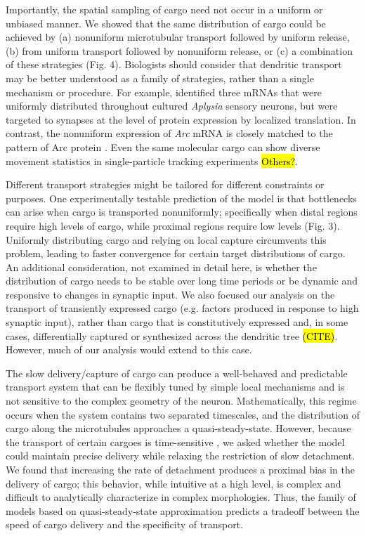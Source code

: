\documentclass[11pt]{wlpeerj}
\begin{document}
Importantly, the spatial sampling of cargo need not occur in a uniform or unbiased manner. We showed that the same distribution of cargo could be achieved by (a) nonuniform microtubular transport followed by uniform release, (b) from uniform transport followed by nonuniform release, or (c) a combination of these strategies (Fig. 4).
Biologists should consider that dendritic transport may be better understood as a family of strategies, rather than a single mechanism or procedure.
For example, \cite{Kim_2015} identified three mRNAs that were uniformly distributed throughout cultured \textit{Aplysia} sensory neurons, but were targeted to synapses at the level of protein expression by localized translation.
In contrast, the nonuniform expression of \textit{Arc} mRNA is closely matched to the pattern of Arc protein \citep{Farris_2014, Steward_2015}.
Even the same molecular cargo can show diverse movement statistics in single-particle tracking experiments \citep{Dynes_2007} \hl{Others?}.

Different transport strategies might be tailored for different constraints or purposes.
One experimentally testable prediction of the model is that bottlenecks can arise when cargo is transported nonuniformly; specifically when distal regions require high levels of cargo, while proximal regions require low levels (Fig. 3).
Uniformly distributing cargo and relying on local capture circumvents this problem, leading to faster convergence for certain target distributions of cargo.
An additional consideration, not examined in detail here, is whether the distribution of cargo needs to be stable over long time periods or be dynamic and responsive to changes in synaptic input.
We also focused our analysis on the transport of transiently expressed cargo (e.g. factors produced in response to high synaptic input), rather than cargo that is constitutively expressed and, in some cases, differentially captured or synthesized across the dendritic tree \hl{(CITE)}.
However, much of our analysis would extend to this case.

The slow delivery/capture of cargo can produce a well-behaved and predictable transport system that can be flexibly tuned by simple local mechanisms and is not sensitive to the complex geometry of the neuron.
Mathematically, this regime occurs when the system contains two separated timescales, and the distribution of cargo along the microtubules approaches a quasi-steady-state.
However, because the transport of certain cargoes is time-sensitive \citep{Frey_1997,Frey_1998}, we asked whether the model could maintain precise delivery while relaxing the restriction of slow detachment.
We found that increasing the rate of detachment produces a proximal bias in the delivery of cargo; this behavior, while intuitive at a high level, is complex and difficult to analytically characterize in complex morphologies.
Thus, the family of models based on quasi-steady-state approximation predicts a tradeoff between the speed of cargo delivery and the specificity of transport. 
\end{document}
